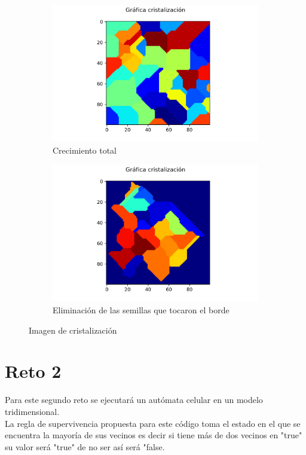 \documentclass{article}
\begin{document}
\begin{figure}[H]
\centering
\begin{subfigure}[b]{0.45\linewidth}
\includegraphics[width=\linewidth]{Reto1_Practica2_29.png}
\caption{Crecimiento total}
\end{subfigure}
\begin{subfigure}[b]{0.45\linewidth}
\includegraphics[width=\linewidth]{Reto1_Practica2_f.png}
\caption{Eliminación de las semillas que tocaron el borde}
\end{subfigure}
\caption{Imagen de cristalización}
\label{fig:westminster}
\end{figure}

\section{Reto 2}
Para este segundo reto se ejecutará un autómata celular en un modelo tridimensional.\\
La regla de supervivencia propuesta para este código toma el estado en el que se encuentra la mayoría de sus vecinos es decir si tiene más de dos vecinos en "true" su valor será "true" de no ser así será "false.
\end{document}
